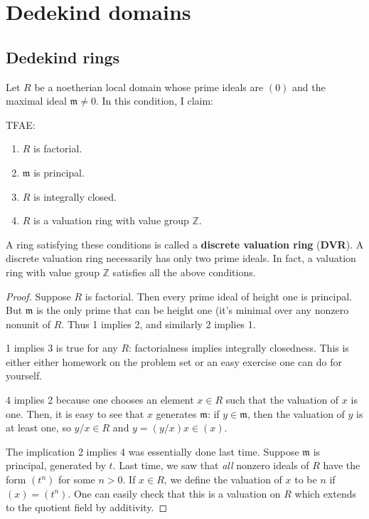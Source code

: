 \chapter{Dedekind domains}

\section{Dedekind rings}


\begin{example} 
Let $R$ be a noetherian local domain whose prime ideals are $(0)$ and the maximal
ideal 
$\mathfrak{m} \neq 0$. In this condition, I claim:
\begin{proposition} 
TFAE:
\begin{enumerate}
\item $R$ is factorial.
\item $\mathfrak{m}$ is principal.
\item  $R$ is integrally closed.
\item $R$ is a valuation ring with value group $\mathbb{Z}$. 
\end{enumerate}
\end{proposition} 
\begin{definition} 
A ring satisfying these conditions is called a \textbf{discrete valuation
ring} (\textbf{DVR}).
A discrete valuation ring necessarily has only two prime ideals. In fact, a
valuation ring with value group $\mathbb{Z}$ satisfies all the above conditions. 
\end{definition} 
\begin{proof} 
Suppose $R$ is factorial. Then every prime ideal of height one is principal.
But $\mathfrak{m}$ is the only prime that can be height one (it's minimal over
any nonzero nonunit of $R$. Thus 1 implies 2, and similarly 2 implies 1.

1 implies 3 is true for any $R$: factorialness implies integrally closedness.
This is either either homework on the problem set or an easy exercise one can
do for yourself. 

4 implies 2 because one chooses an element $x \in R$ such that the valuation of
$x$ is one. Then, it is easy to see that $x$ generates $\mathfrak{m}$: if $y
\in \mathfrak{m}$, then the valuation of $y$ is at least one, so $y/x \in R$
and $y = (y/x)x \in (x)$. 

The implication 2 implies 4 was essentially done last time. Suppose
$\mathfrak{m}$ is principal, generated by $t$. Last time, we saw that
\emph{all} nonzero ideals of $R$ have the form $(t^n)$ for some $n>0$.  If $x
\in R$, we define the valuation of $x$ to be $n$ if $(x) = (t^n)$. One can
easily check that this is a valuation on $R$ which extends to the quotient
field by additivity.


\end{proof}
\end{example}
